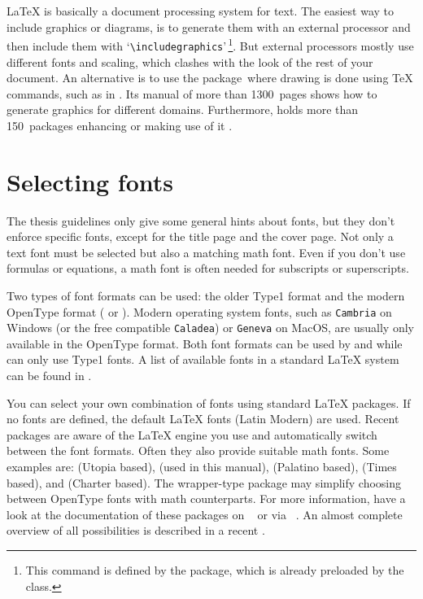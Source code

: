 LaTeX is basically a document processing system for text. The easiest way to
include graphics or diagrams, is to generate them with an external processor
and then include them with `\verb"\includegraphics"'\,\footnote{This command is
  defined by the  package, which is already preloaded by the
   class.}. But external processors mostly use different fonts and
scaling, which clashes with the look of the rest of your document. An
alternative is to use the  package\,\cite{pkg:tikz} where drawing is
done using TeX commands, such as in . Its manual of more than
1300~pages shows how to generate graphics for different domains. Furthermore,
 holds more than 150~packages enhancing  or making use of
it \cite{CTAN-tikz}.

\section{Selecting fonts}\label{sec:fonts}
The thesis guidelines only give some general hints about fonts, but they don't
enforce specific fonts, except for the title page and the cover page. Not only
a text font must be selected but also a matching math font. Even if you don't
use formulas or equations, a math font is often needed for subscripts or
superscripts.

Two types of font formats can be used: the older Type1 format and the modern
OpenType format ( or ). Modern operating system fonts, such
as \texttt{Cambria} on Windows (or the free compatible \texttt{Caladea}) or
\texttt{Geneva} on MacOS, are usually only available in the OpenType format.
Both font formats can be used by  and  while
 can only use Type1 fonts. A list of available fonts in a
standard LaTeX system can be found in .

You can select your own combination of fonts using standard LaTeX packages. If
no fonts are defined, the default LaTeX fonts (Latin Modern) are used. Recent
packages are aware of the LaTeX engine you use and automatically switch between
the font formats. Often they also provide suitable math fonts. Some examples
are:  (Utopia based),  (used in this manual),
 (Palatino based),  (Times based), and 
(Charter based). The wrapper-type package  may simplify choosing
between OpenType fonts with math counterparts. For more information, have a
look at the documentation of these packages on ~\cite{CTAN} or via
~\cite{texdoc}. An almost complete overview of all possibilities
is described in a recent .

